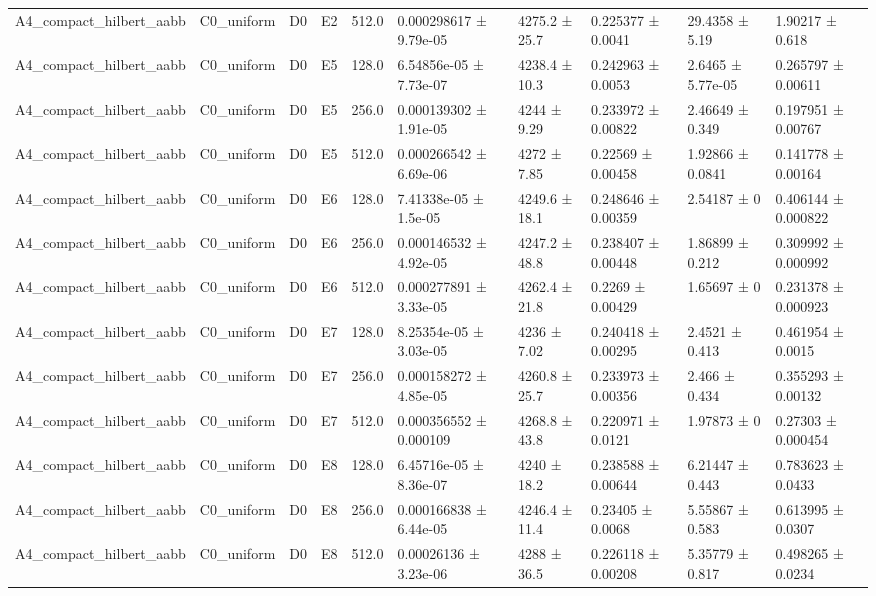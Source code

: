 \begin{table}
\begin{tabular}{llllllllll}
A4\_compact\_hilbert\_aabb & C0\_uniform & D0 & E2 & 512.0 & 0.000298617 ± 9.79e-05 & 4275.2 ± 25.7 & 0.225377 ± 0.0041 & 29.4358 ± 5.19 & 1.90217 ± 0.618 \\
A4\_compact\_hilbert\_aabb & C0\_uniform & D0 & E5 & 128.0 & 6.54856e-05 ± 7.73e-07 & 4238.4 ± 10.3 & 0.242963 ± 0.0053 & 2.6465 ± 5.77e-05 & 0.265797 ± 0.00611 \\
A4\_compact\_hilbert\_aabb & C0\_uniform & D0 & E5 & 256.0 & 0.000139302 ± 1.91e-05 & 4244 ± 9.29 & 0.233972 ± 0.00822 & 2.46649 ± 0.349 & 0.197951 ± 0.00767 \\
A4\_compact\_hilbert\_aabb & C0\_uniform & D0 & E5 & 512.0 & 0.000266542 ± 6.69e-06 & 4272 ± 7.85 & 0.22569 ± 0.00458 & 1.92866 ± 0.0841 & 0.141778 ± 0.00164 \\
A4\_compact\_hilbert\_aabb & C0\_uniform & D0 & E6 & 128.0 & 7.41338e-05 ± 1.5e-05 & 4249.6 ± 18.1 & 0.248646 ± 0.00359 & 2.54187 ± 0 & 0.406144 ± 0.000822 \\
A4\_compact\_hilbert\_aabb & C0\_uniform & D0 & E6 & 256.0 & 0.000146532 ± 4.92e-05 & 4247.2 ± 48.8 & 0.238407 ± 0.00448 & 1.86899 ± 0.212 & 0.309992 ± 0.000992 \\
A4\_compact\_hilbert\_aabb & C0\_uniform & D0 & E6 & 512.0 & 0.000277891 ± 3.33e-05 & 4262.4 ± 21.8 & 0.2269 ± 0.00429 & 1.65697 ± 0 & 0.231378 ± 0.000923 \\
A4\_compact\_hilbert\_aabb & C0\_uniform & D0 & E7 & 128.0 & 8.25354e-05 ± 3.03e-05 & 4236 ± 7.02 & 0.240418 ± 0.00295 & 2.4521 ± 0.413 & 0.461954 ± 0.0015 \\
A4\_compact\_hilbert\_aabb & C0\_uniform & D0 & E7 & 256.0 & 0.000158272 ± 4.85e-05 & 4260.8 ± 25.7 & 0.233973 ± 0.00356 & 2.466 ± 0.434 & 0.355293 ± 0.00132 \\
A4\_compact\_hilbert\_aabb & C0\_uniform & D0 & E7 & 512.0 & 0.000356552 ± 0.000109 & 4268.8 ± 43.8 & 0.220971 ± 0.0121 & 1.97873 ± 0 & 0.27303 ± 0.000454 \\
A4\_compact\_hilbert\_aabb & C0\_uniform & D0 & E8 & 128.0 & 6.45716e-05 ± 8.36e-07 & 4240 ± 18.2 & 0.238588 ± 0.00644 & 6.21447 ± 0.443 & 0.783623 ± 0.0433 \\
A4\_compact\_hilbert\_aabb & C0\_uniform & D0 & E8 & 256.0 & 0.000166838 ± 6.44e-05 & 4246.4 ± 11.4 & 0.23405 ± 0.0068 & 5.55867 ± 0.583 & 0.613995 ± 0.0307 \\
A4\_compact\_hilbert\_aabb & C0\_uniform & D0 & E8 & 512.0 & 0.00026136 ± 3.23e-06 & 4288 ± 36.5 & 0.226118 ± 0.00208 & 5.35779 ± 0.817 & 0.498265 ± 0.0234 \\

\end{tabular}
\end{table}
